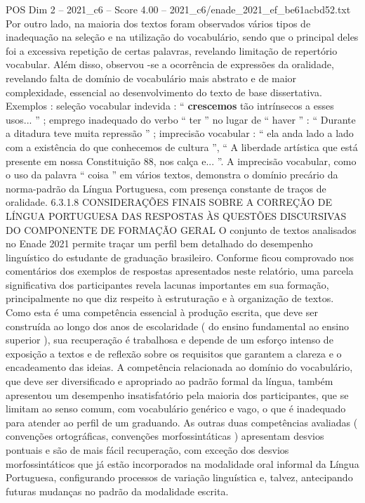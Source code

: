 \begin{textsample}{POS Dim 2 – 2021\_c6 – Score 4.00 – 2021\_c6/enade\_2021\_ef\_be61acbd52.txt}
Por outro lado, na maioria dos textos foram observados vários tipos de inadequação na seleção e na utilização do vocabulário, sendo que o principal deles foi a excessiva repetição de certas palavras, revelando limitação de repertório vocabular.
Além disso, observou -se a ocorrência de expressões da oralidade, revelando falta de domínio de vocabulário mais abstrato e de maior complexidade, essencial ao desenvolvimento do texto de base dissertativa.
Exemplos : seleção vocabular indevida : “ \textbf{crescemos} tão intrínsecos a esses usos... ” ; emprego inadequado do verbo “ ter ” no lugar de “ haver ” : “ Durante a ditadura teve muita repressão ” ; imprecisão vocabular : “ ela anda lado a lado com a existência do que conhecemos de cultura ”, “ A liberdade artística que está presente em nossa Constituição 88, nos calça e... ”.
A imprecisão vocabular, como o uso da palavra “ coisa ” em vários textos, demonstra o domínio precário da norma-padrão da Língua Portuguesa, com presença constante de traços de oralidade. 6.3.1.8 CONSIDERAÇÕES FINAIS SOBRE A CORREÇÃO DE LÍNGUA PORTUGUESA DAS RESPOSTAS ÀS QUESTÕES DISCURSIVAS DO COMPONENTE DE FORMAÇÃO GERAL O conjunto de textos analisados no Enade 2021 permite traçar um perfil bem detalhado do desempenho linguístico do estudante de graduação brasileiro.
Conforme ficou comprovado nos comentários dos exemplos de respostas apresentados neste relatório, uma parcela significativa dos participantes revela lacunas importantes em sua formação, principalmente no que diz respeito à estruturação e à organização de textos.
Como esta é uma competência essencial à produção escrita, que deve ser construída ao longo dos anos de escolaridade ( do ensino fundamental ao ensino superior ), sua recuperação é trabalhosa e depende de um esforço intenso de exposição a textos e de reflexão sobre os requisitos que garantem a clareza e o encadeamento das ideias.
A competência relacionada ao domínio do vocabulário, que deve ser diversificado e apropriado ao padrão formal da língua, também apresentou um desempenho insatisfatório pela maioria dos participantes, que se limitam ao senso comum, com vocabulário genérico e vago, o que é inadequado para atender ao perfil de um graduando.
As outras duas competências avaliadas ( convenções ortográficas, convenções morfossintáticas ) apresentam desvios pontuais e são de mais fácil recuperação, com exceção dos desvios morfossintáticos que já estão incorporados na modalidade oral informal da Língua Portuguesa, configurando processos de variação linguística e, talvez, antecipando futuras mudanças no padrão da modalidade escrita.

\end{textsample}

